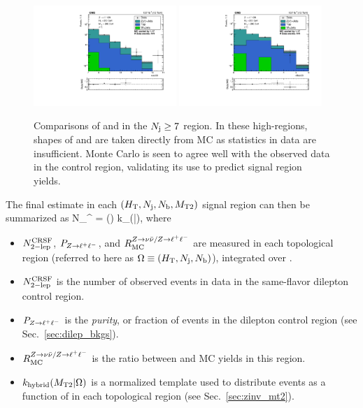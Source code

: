 \begin{figure}[ht]
  \begin{center}
    \includegraphics[width=0.48\textwidth]{figs/zinv/crdybase_nJet30_ge7j.pdf}
    \includegraphics[width=0.48\textwidth]{figs/zinv/crdybase_nBJet20_ge7j.pdf} \\
    \caption{Comparisons of \Nj and \Nb in the $N_{\mathrm{j}}\geq7$ region. In these high-\Nj regions, 
      shapes of \Nj and \Nb are taken directly from MC as statistics in data are insufficient.
      Monte Carlo is seen to agree well with the observed data in the control region, 
      validating its use to predict signal region yields.
            }
    \label{fig:zll_ge7j}
  \end{center}
\end{figure}


The final estimate in each $(H_{\mathrm{T}},N_{\mathrm{j}},N_{\mathrm{b}},M_{\mathrm{T2}})$ signal region can then be summarized as
\be\label{eq:zinv_est}
N_{\znunu}^ = 
(\Omega) \times k_(\mttwo|\Omega),
\ee
where
\begin{itemize}\setlength\itemsep{0mm}
\item $N_{\mathrm{2-lep}}^{\mathrm{CRSF}}$, $P_{Z\to\ell^+\ell^-}$, and $R_{\mathrm{MC}}^{Z\to\nu\bar{\nu}/Z\to\ell^+\ell^-}$ are measured in each topological
region (referred to here as $\Omega\equiv(H_{\mathrm{T}},N_{\mathrm{j}},N_{\mathrm{b}})$), integrated over \mttwo.
\item $N_{\mathrm{2-lep}}^{\mathrm{CRSF}}$ is the number of observed events in data in the same-flavor dilepton control region.
\item $P_{Z\to\ell^+\ell^-}$ is the \emph{purity}, or fraction of \zll events in the dilepton control region
(see Sec.~\ref{sec:dilep_bkgs}).
\item $R_{\mathrm{MC}}^{Z\to\nu\bar{\nu}/Z\to\ell^+\ell^-}$ is the ratio between \znunu and \zll MC yields in this region.
\item $k_{\mathrm{hybrid}}(M_{\mathrm{T2}}|\Omega)$ is a normalized template used to distribute events as a function
of \mttwo in each topological region (see Sec.~\ref{sec:zinv_mt2}).
\end{itemize}

